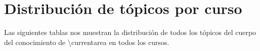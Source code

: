 \section{Distribución de tópicos por curso}\label{sec:topics-by-course}
Las siguientes tablas nos muestran la distribución de todos los tópicos del 
cuerpo del conocimiento de \ac{\currentarea} en todos los cursos.
